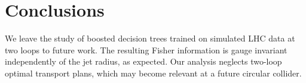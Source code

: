 \section{Conclusions}\label{sec:conclusions}

We leave the study of boosted decision trees trained on simulated LHC
data at two loops to future work. The resulting Fisher information is
gauge invariant independently of the jet radius, as expected. Our
analysis neglects two-loop optimal transport plans, which may become
relevant at a future circular collider.

